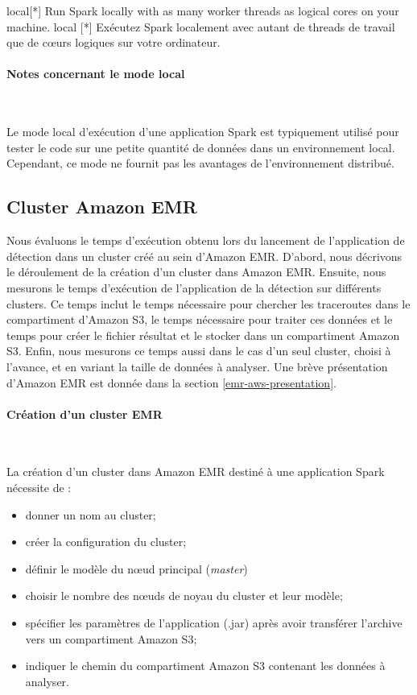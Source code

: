 local[*] Run Spark locally with as many worker threads as logical cores on your machine.
local [*] Exécutez Spark localement avec autant de threads de travail que de c\oe{}urs logiques sur votre ordinateur.

\paragraph{Notes concernant le mode local}~

Le mode local d'exécution d'une application Spark est typiquement utilisé pour tester le code sur une petite quantité de données dans un environnement local. Cependant, ce mode  ne fournit pas les avantages de l'environnement distribué. 

\subsection{Cluster Amazon EMR}

Nous évaluons le temps d'exécution obtenu lors du lancement de l'application de détection dans un cluster créé au sein d'Amazon EMR. D'abord, nous  décrivons le déroulement de la création d'un cluster dans Amazon EMR. Ensuite, nous mesurons le temps d'exécution de l'application de la détection sur différents clusters. Ce temps inclut le temps nécessaire  pour chercher les traceroutes dans le compartiment d'Amazon S3, le temps nécessaire pour traiter ces données et  le temps pour créer le fichier résultat et le stocker dans un compartiment Amazon S3. Enfin, nous mesurons ce temps  aussi dans le cas d'un seul cluster, choisi à l'avance, et en variant la taille  de données à analyser. Une brève présentation d'Amazon EMR est donnée dans la section \ref{emr-aws-presentation}.

\paragraph{Création d'un cluster EMR}~

La création d'un cluster dans Amazon EMR destiné à une application Spark nécessite de  :
\begin{itemize}
	\item donner un nom au cluster;
	\item créer la configuration du cluster;
	\item définir le modèle du n\oe{}ud principal (\textit{master}) 
	\item choisir le nombre des n\oe{}uds de noyau  du cluster et leur modèle;
	\item spécifier les paramètres de l'application  (.jar) après avoir transférer l'archive vers  un compartiment Amazon S3;
	\item indiquer le chemin du compartiment Amazon S3 contenant  les données à analyser.
\end{itemize}

